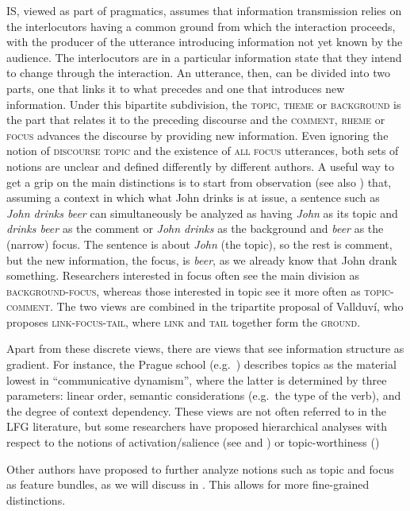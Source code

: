 \documentclass[output=paper,hidelinks]{langscibook}
\begin{document}
IS, viewed as part of pragmatics, assumes that information transmission relies on the interlocutors having a common ground from which the interaction proceeds,  with the producer of the utterance introducing information not yet known by the audience. The interlocutors are in a particular information state that they intend to change through the interaction. 
An utterance, then, can be divided into two parts, one that links it to what precedes and one that introduces new information.  Under this bipartite subdivision, the \textsc{topic}, \textsc{theme} or \textsc{background} is the part that relates it to the preceding discourse and the \textsc{comment}, \textsc{rheme} or \textsc{focus} advances the discourse by providing new information. Even ignoring the notion of \textsc{discourse topic} and the existence of \textsc{all focus} utterances, both sets of notions are unclear and defined differently by different authors. A useful way to get a grip on the main distinctions is to start from  observation (see also \citealt{Jacobs}) that, assuming a context in which what John drinks is at issue, a sentence such as \textit{John drinks beer} can simultaneously be analyzed as having \textit{John} as its topic and \textit{drinks beer} as the comment or \textit{John drinks} as the background and \textit{beer} as the (narrow) focus. The sentence is about \textit{John} (the topic), so the rest is comment, but the new information, the focus, is \textit{beer},  as we already know that John drank something. Researchers interested in focus often see the main division as \textsc{background-focus}, whereas those interested in topic see it more often as \textsc{topic-comment}. The two views are combined in the tripartite proposal of Vallduv\'{i}, who proposes \textsc{link-focus-tail}, where \textsc{link} and \textsc{tail} together form the \textsc{ground}. 

Apart from these discrete views, there are views that see information structure as gradient. For instance, the Prague school (e.g.\ \citealt{Firbas}) describes topics as the material lowest in ``communicative dynamism'', where the latter is determined by three parameters: linear order, semantic considerations (e.g.\ the type of the verb), and the degree of context dependency. These views are not often referred to in the LFG literature, but some researchers have proposed hierarchical analyses with respect to the notions of activation/salience  (see \citealt{A09} and \citealt{Connor2006}) or topic-worthiness (\citealt{DN})

Other authors have proposed to further analyze notions such as topic and focus as feature bundles, as we will discuss in . This allows for more fine-grained distinctions. 
\end{document}
